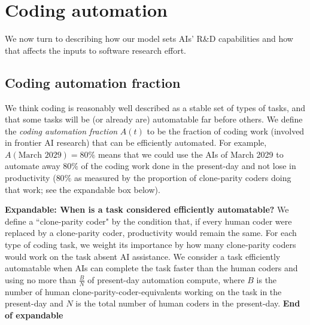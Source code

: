 \documentclass{article}
\theoremstyle{definition}
\newcommand{\ASUG}[1]{\textcolor{magenta}{ALEX-SUGGESTION: #1}}
\begin{document}

\section{Coding automation} \label{Coding automation}

We now turn to describing how our model sets AIs' R\&D capabilities and how that affects the inputs to software research effort.

\subsection{Coding automation fraction} \label{Coding automation fraction}

We think coding is reasonably well described as a stable set of types of tasks, and that some tasks will be (or already are) automatable far before others. %
We define the \textit{coding automation fraction} $A(t)$ to be the fraction of coding work (involved in frontier AI research) that can be efficiently automated. For example, $A(\text{March 2029}) = 80\%$ means that we could use the AIs of March 2029 to automate away $80\%$ of the coding work done in the present-day and not lose in productivity ($80\%$ as measured by the proportion of clone-parity coders doing that work; see the expandable box below).


\label{When is a task considered efficiently automatable?}
\textbf{Expandable: When is a task considered efficiently automatable?} We define a ``clone-parity coder" by the condition that, if every human coder were replaced by a clone-parity coder, productivity would remain the same. For each type of coding task, we weight its importance by how many clone-parity coders would work on the task absent AI assistance. We consider a task efficiently automatable when AIs can complete the task faster than the human coders and using no more than $\frac{B}{N}$ of present-day automation compute, where $B$ is the number of human clone-parity-coder-equivalents working on the task in the present-day and $N$ is the total number of human coders in the present-day. \textbf{End of expandable}
\end{document}
